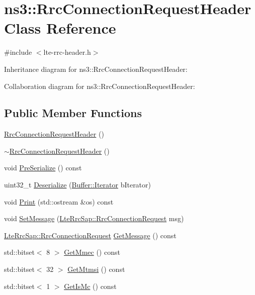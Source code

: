\hypertarget{classns3_1_1RrcConnectionRequestHeader}{}\section{ns3\+:\+:Rrc\+Connection\+Request\+Header Class Reference}
\label{classns3_1_1RrcConnectionRequestHeader}


{\ttfamily \#include $<$lte-\/rrc-\/header.\+h$>$}



Inheritance diagram for ns3\+:\+:Rrc\+Connection\+Request\+Header\+:


Collaboration diagram for ns3\+:\+:Rrc\+Connection\+Request\+Header\+:
\subsection*{Public Member Functions}
\begin{DoxyCompactItemize}
\item 
\hyperlink{classns3_1_1RrcConnectionRequestHeader_a0907c3fc6046e2efc23e0759ceb7be32}{Rrc\+Connection\+Request\+Header} ()
\item 
\hyperlink{classns3_1_1RrcConnectionRequestHeader_a3bafe923ab152b3dfc4c687c38d269a2}{$\sim$\+Rrc\+Connection\+Request\+Header} ()
\item 
void \hyperlink{classns3_1_1RrcConnectionRequestHeader_a03e4c8ec6a272eb57fccd183beabf12d}{Pre\+Serialize} () const 
\item 
uint32\+\_\+t \hyperlink{classns3_1_1RrcConnectionRequestHeader_a6362799c63372977477e5a98013c8877}{Deserialize} (\hyperlink{classns3_1_1Buffer_1_1Iterator}{Buffer\+::\+Iterator} b\+Iterator)
\item 
void \hyperlink{classns3_1_1RrcConnectionRequestHeader_aad9777109268b1ebaf3b55c549aade6f}{Print} (std\+::ostream \&os) const 
\item 
void \hyperlink{classns3_1_1RrcConnectionRequestHeader_a63ed46e57bfb9d0c2ddf74b85ce0d8fe}{Set\+Message} (\hyperlink{structns3_1_1LteRrcSap_1_1RrcConnectionRequest}{Lte\+Rrc\+Sap\+::\+Rrc\+Connection\+Request} msg)
\item 
\hyperlink{structns3_1_1LteRrcSap_1_1RrcConnectionRequest}{Lte\+Rrc\+Sap\+::\+Rrc\+Connection\+Request} \hyperlink{classns3_1_1RrcConnectionRequestHeader_a5d164a3b685779c1229785b7a96e2a65}{Get\+Message} () const 
\item 
std\+::bitset$<$ 8 $>$ \hyperlink{classns3_1_1RrcConnectionRequestHeader_a3b1f0e2c890fa4856a7cdbacc460d078}{Get\+Mmec} () const 
\item 
std\+::bitset$<$ 32 $>$ \hyperlink{classns3_1_1RrcConnectionRequestHeader_a5cdd93d6f9ccb918352ee3fd6cd7e73f}{Get\+Mtmsi} () const 
\item 
std\+::bitset$<$ 1 $>$ \hyperlink{classns3_1_1RrcConnectionRequestHeader_ae3003eaa2bb3568cba78598c5096ffd3}{Get\+Is\+Mc} () const 
\end{DoxyCompactItemize}
